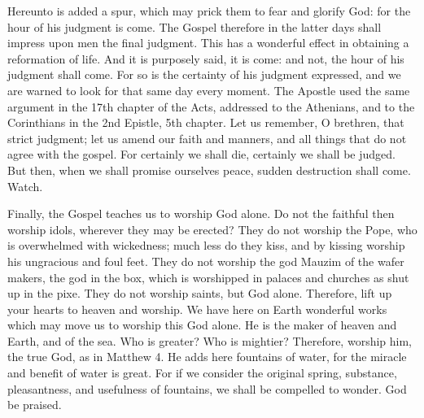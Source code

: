 Hereunto is added a spur, which may prick them to fear and glorify God: for the hour of his judgment is come. The Gospel therefore in the latter days shall impress upon men the final judgment. This has a wonderful effect in obtaining a reformation of life. And it is purposely said, it is come: and not, the hour of his judgment shall come. For so is the certainty of his judgment expressed, and we are warned to look for that same day every moment. The Apostle used the same argument in the 17th chapter of the Acts, addressed to the Athenians, and to the Corinthians in the 2nd Epistle, 5th chapter. Let us remember, O brethren, that strict judgment; let us amend our faith and manners, and all things that do not agree with the gospel. For certainly we shall die, certainly we shall be judged. But then, when we shall promise ourselves peace, sudden destruction shall come. Watch.

Finally, the Gospel teaches us to worship God alone. Do not the faithful then worship idols, wherever they may be erected? They do not worship the Pope, who is overwhelmed with wickedness; much less do they kiss, and by kissing worship his ungracious and foul feet. They do not worship the god Mauzim of the wafer makers, the god in the box, which is worshipped in palaces and churches as shut up in the pixe. They do not worship saints, but God alone. Therefore, lift up your hearts to heaven and worship. We have here on Earth wonderful works which may move us to worship this God alone. He is the maker of heaven and Earth, and of the sea. Who is greater? Who is mightier? Therefore, worship him, the true God, as in Matthew 4. He adds here fountains of water, for the miracle and benefit of water is great. For if we consider the original spring, substance, pleasantness, and usefulness of fountains, we shall be compelled to wonder. God be praised.
